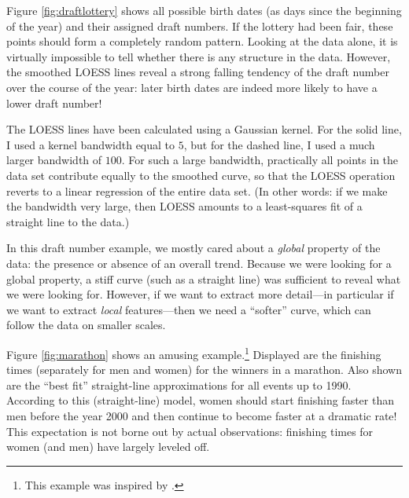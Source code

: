 Figure \ref{fig:draftlottery} shows all possible birth dates (as days
since the beginning of the year) and their assigned draft numbers.\vadjust{\pagebreak}  If
the lottery had been fair, these points should form a completely
random pattern. Looking at the data alone, it is virtually impossible
to tell whether there is any structure in the data. However, the
smoothed LOESS lines reveal a strong falling tendency of the draft
number over the course of the year: later birth dates are indeed more
likely to have a lower draft number!

The LOESS lines have been calculated using a Gaussian kernel.  For the
solid line, I used a kernel bandwidth equal to $5$, but for the dashed
line, I used a much larger bandwidth of $100$. For such a large
bandwidth, practically all points in the data set contribute equally
to the smoothed curve, so that the LOESS operation reverts to a linear
regression of the entire data set. (In other words: if we make the
bandwidth very large, then LOESS amounts to a least-squares fit of a
straight line to the data.)

In this draft number example, we mostly cared about a \emph{global}
property of the data: the presence or absence of an overall trend.
Because we were looking for a global property, a stiff curve (such as
a straight line) was sufficient to reveal what we were looking for.
However, if we want to extract more detail---in particular if we want
to extract \emph{local} features---then we need a ``softer'' curve,
which can follow the data on smaller scales.

Figure \ref{fig:marathon} shows an amusing example.\footnote{This
  example was inspired by .} Displayed are the finishing times
(separately for men and women) for the winners in a marathon. Also
shown are the ``best fit'' straight-line approximations for all events
up to 1990. According to this (straight-line) model, women should
start finishing faster than men before the year 2000 and then continue
to become faster at a dramatic rate! This expectation is not borne out
by actual observations: finishing times for women (and men) have
largely leveled off.

